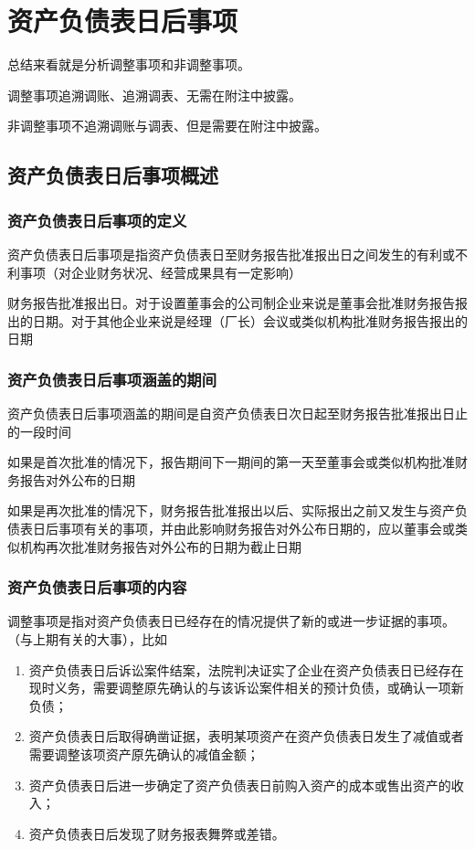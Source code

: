 \documentclass[UTF8,12pt]{ctexart}
\numberwithin{equation}{section} %
\numberwithin{figure}{section}
\numberwithin{table}{section}
\begin{document}
	\newpage
	
	\section{资产负债表日后事项}
	总结来看就是分析调整事项和非调整事项。
	
	调整事项追溯调账、追溯调表、无需在附注中披露。
	
	非调整事项不追溯调账与调表、但是需要在附注中披露。
	
	\subsection{资产负债表日后事项概述}
	\subsubsection{资产负债表日后事项的定义}
	资产负债表日后事项是指资产负债表日至财务报告批准报出日之间发生的有利或不利事项（对企业财务状况、经营成果具有一定影响）
	
	财务报告批准报出日。对于设置董事会的公司制企业来说是董事会批准财务报告报出的日期。对于其他企业来说是经理（厂长）会议或类似机构批准财务报告报出的日期
	
	
	\subsubsection{资产负债表日后事项涵盖的期间}
	资产负债表日后事项涵盖的期间是自资产负债表日次日起至财务报告批准报出日止的一段时间
	
	如果是首次批准的情况下，报告期间下一期间的第一天至董事会或类似机构批准财务报告对外公布的日期
	
	如果是再次批准的情况下，财务报告批准报出以后、实际报出之前又发生与资产负债表日后事项有关的事项，并由此影响财务报告对外公布日期的，应以董事会或类似机构再次批准财务报告对外公布的日期为截止日期
	
	
	\subsubsection{资产负债表日后事项的内容}
	调整事项是指对资产负债表日已经存在的情况提供了新的或进一步证据的事项。（与上期有关的大事），比如
	\begin{enumerate}
		\item 资产负债表日后诉讼案件结案，法院判决证实了企业在资产负债表日已经存在现时义务，需要调整原先确认的与该诉讼案件相关的预计负债，或确认一项新负债；
		
		\item 资产负债表日后取得确凿证据，表明某项资产在资产负债表日发生了减值或者需要调整该项资产原先确认的减值金额；
		
		\item 资产负债表日后进一步确定了资产负债表日前购入资产的成本或售出资产的收入；
		
		\item 资产负债表日后发现了财务报表舞弊或差错。
	\end{enumerate}
	
\end{document}

